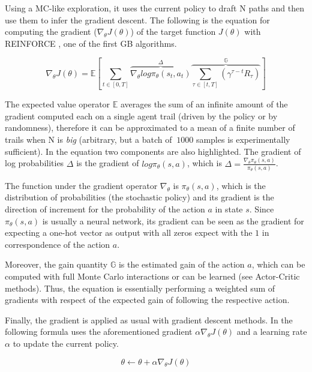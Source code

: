 Using a MC-like exploration, it uses the current policy to draft N paths and then use them to infer the gradient descent.
The following is the equation for computing the gradient ($\nabla_\theta J(\theta)$) of the target function $J(\theta)$ with REINFORCE \cite{Sewak2019}, one of the first GB algorithms.

\begin{equation}
  \label{eq:policy-gradient-equation}
  \nabla _ {\theta} J(\theta) = \mathbb{E}
    \left[
      \sum _ {t \in [0, T]} \overbrace{\nabla _ {\theta} log \pi _ \theta (s_t, a_t)}^{\Delta} \overbrace{\sum _ {\tau \in [t, T]} (\gamma ^ {\tau - t} R _ \tau)}^{\mathbb{G}}
    \right]
\end{equation}

The expected value operator $\mathbb {E}$ averages the sum of an infinite amount of the gradient computed each on a single agent trail (driven by the policy or by randomness), therefore it can be approximated to a mean of a finite number of trails when N is \textit{big} (arbitrary, but a batch of $~1000$ samples is experimentally sufficient). In the equation two components are also highlighted. The gradient of log probabilities $\mathbb{\Delta}$ is the gradient of $log \pi _ \theta (s, a)$, which is $\Delta = \frac {\nabla _ \theta \pi _ \theta (s, a)} {\pi _ \theta (s, a)}$.

The function under the gradient operator $\nabla _ \theta$ is $\pi _ \theta (s, a)$, which is the distribution of probabilities (the stochastic policy) and its gradient is the direction of increment for the probability of the action $a$ in state $s$. Since $\pi _ \theta (s,a)$ is usually a neural network, its gradient can be seen as the gradient for expecting a one-hot vector as output with all zeros expect with the $1$ in correspondence of the action $a$.

Moreover, the gain quantity $\mathbb{G}$ is the estimated gain of the action $a$, which can be computed with full Monte Carlo interactions or can be learned (see Actor-Critic methods). Thus, the equation is essentially performing a weighted sum of gradients with respect of the expected gain of following the respective action.

Finally, the gradient is applied as usual with gradient descent methods. In the following formula uses the aforementioned gradient $\alpha \nabla _ {\theta} J(\theta)$ and a learning rate $\alpha$ to update the current policy.

\begin{equation}
  \theta \leftarrow \theta + \alpha \nabla _ {\theta} J(\theta)
\end{equation}

